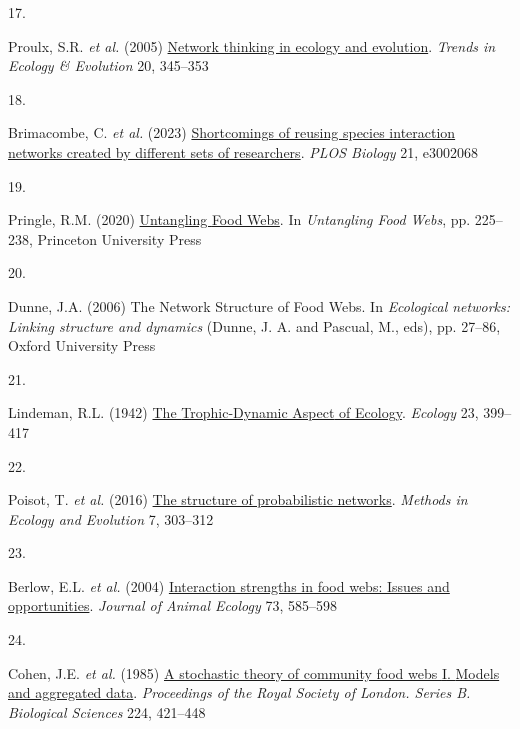 \documentclass[
]{article}
\newlength{\cslhangindent}
\newlength{\csllabelwidth}
\newenvironment{CSLReferences}[2] %
 {\begin{list}{}{%
  \setlength{\itemindent}{0pt}
  \setlength{\leftmargin}{0pt}
  \setlength{\parsep}{0pt}
  \ifodd #1
   \setlength{\leftmargin}{\cslhangindent}
   \setlength{\itemindent}{-1\cslhangindent}
  \fi
  \setlength{\itemsep}{#2\baselineskip}}}
 {\end{list}}
\newcommand{\CSLLeftMargin}[1]{\parbox[t]{\csllabelwidth}{\strut#1\strut}}
\newcommand{\CSLRightInline}[1]{\parbox[t]{\linewidth - \csllabelwidth}{\strut#1\strut}}
\begin{document}
\begin{CSLReferences}{0}{0}
\CSLLeftMargin{17. }%
\CSLRightInline{Proulx, S.R. \emph{et al.} (2005)
\href{https://doi.org/10.1016/j.tree.2005.04.004}{Network thinking in
ecology and evolution}. \emph{Trends in Ecology \& Evolution} 20,
345--353}

\CSLLeftMargin{18. }%
\CSLRightInline{Brimacombe, C. \emph{et al.} (2023)
\href{https://doi.org/10.1371/journal.pbio.3002068}{Shortcomings of
reusing species interaction networks created by different sets of
researchers}. \emph{PLOS Biology} 21, e3002068}

\CSLLeftMargin{19. }%
\CSLRightInline{Pringle, R.M. (2020)
\href{https://doi.org/10.1515/9780691195322-020}{Untangling {Food
Webs}}. In \emph{Untangling {Food Webs}}, pp. 225--238, Princeton
University Press}

\CSLLeftMargin{20. }%
\CSLRightInline{Dunne, J.A. (2006) The {Network Structure} of {Food
Webs}. In \emph{Ecological networks: {Linking} structure and dynamics}
(Dunne, J. A. and Pascual, M., eds), pp. 27--86, Oxford University
Press}

\CSLLeftMargin{21. }%
\CSLRightInline{Lindeman, R.L. (1942)
\href{https://doi.org/10.2307/1930126}{The {Trophic-Dynamic Aspect} of
{Ecology}}. \emph{Ecology} 23, 399--417}

\CSLLeftMargin{22. }%
\CSLRightInline{Poisot, T. \emph{et al.} (2016)
\href{https://doi.org/10}{The structure of probabilistic networks}.
\emph{Methods in Ecology and Evolution} 7, 303--312}

\CSLLeftMargin{23. }%
\CSLRightInline{Berlow, E.L. \emph{et al.} (2004)
\href{https://doi.org/10.1111/j.0021-8790.2004.00833.x}{Interaction
strengths in food webs: Issues and opportunities}. \emph{Journal of
Animal Ecology} 73, 585--598}

\CSLLeftMargin{24. }%
\CSLRightInline{Cohen, J.E. \emph{et al.} (1985)
\href{https://doi.org/10.1098/rspb.1985.0042}{A stochastic theory of
community food webs {I}. {Models} and aggregated data}.
\emph{Proceedings of the Royal Society of London. Series B. Biological
Sciences} 224, 421--448}


\end{CSLReferences}
\end{document}
